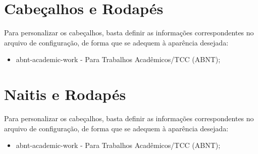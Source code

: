 
\chapter{Cabeçalhos e Rodapés}

Para personalizar os cabeçalhos, basta definir as informações correspondentes no arquivo de configuração, de forma que se adequem à aparência desejada:

\begin{itemize}

    \item abnt-academic-work - Para Trabalhos Acadêmicos/TCC (ABNT);

\end{itemize}

\chapter{Naitis e Rodapés}

Para personalizar os cabeçalhos, basta definir as informações correspondentes no arquivo de configuração, de forma que se adequem à aparência desejada:

\begin{itemize}

    \item abnt-academic-work - Para Trabalhos Acadêmicos/TCC (ABNT);

\end{itemize}

